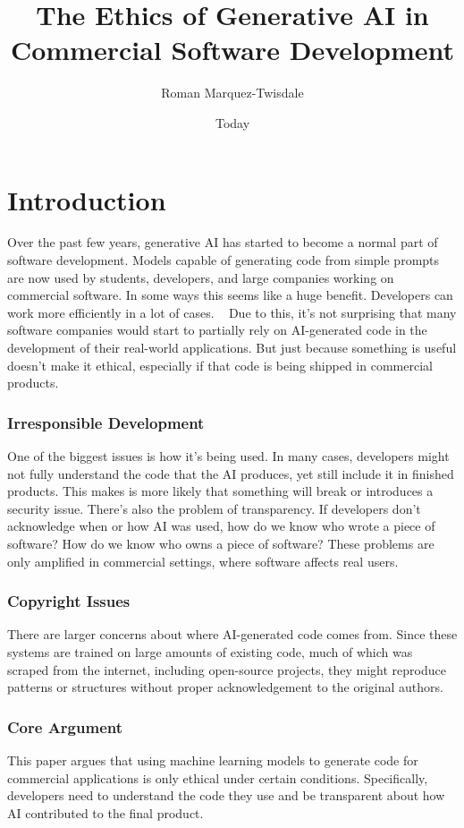 \documentclass[sigconf, 12pt]{acmart}
\begin{document}
\title{The Ethics of Generative AI in Commercial Software Development}
\author{Roman Marquez-Twisdale}

\date{Today}
\maketitle

\section{Introduction}
Over the past few years, generative AI has started to become a normal part of software development. Models capable of generating code from simple prompts are now used by students, developers, and large companies working on commercial software. In some ways this seems like a huge benefit. Developers can work more efficiently in a lot of cases. ~\cite{(11)} Due to this, it’s not surprising that many software companies would start to partially rely on AI-generated code in the development of their real-world applications. But just because something is useful doesn’t make it ethical, especially if that code is being shipped in commercial products.
\subsubsection{Irresponsible Development}
One of the biggest issues is how it’s being used. In many cases, developers might not fully understand the code that the AI produces, yet still include it in finished products. This makes is more likely that something will break or introduces a security issue. There’s also the problem of transparency. If developers don’t acknowledge when or how AI was used, how do we know who wrote a piece of software? How do we know who owns a piece of software? These problems are only amplified in commercial settings, where software affects real users.
\subsubsection{Copyright Issues}
There are larger concerns about where AI-generated code comes from. Since these systems are trained on large amounts of existing code, much of which was scraped from the internet, including open-source projects, they might reproduce patterns or structures without proper acknowledgement to the original authors.
\subsubsection{Core Argument}
This paper argues that using machine learning models to generate code for commercial applications is only ethical under certain conditions. Specifically, developers need to understand the code they use and be transparent about how AI contributed to the final product.
\end{document}
